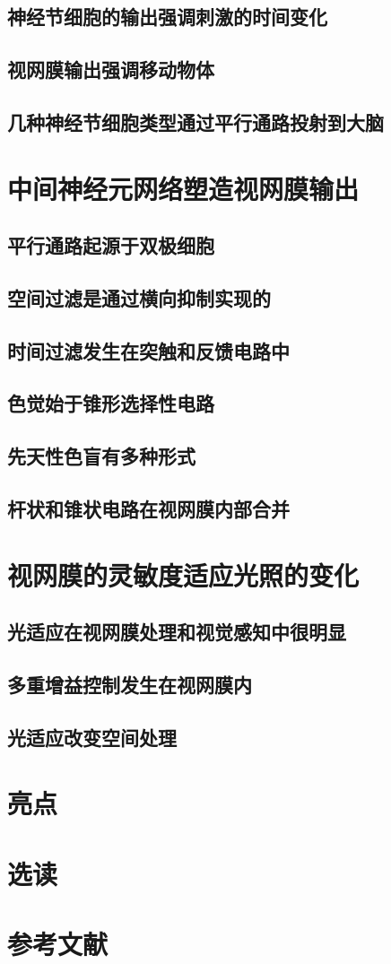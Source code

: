 \subsection{神经节细胞的输出强调刺激的时间变化}
\subsection{视网膜输出强调移动物体}
\subsection{几种神经节细胞类型通过平行通路投射到大脑}

\section{中间神经元网络塑造视网膜输出}
\subsection{平行通路起源于双极细胞}
\subsection{空间过滤是通过横向抑制实现的}
\subsection{时间过滤发生在突触和反馈电路中}
\subsection{色觉始于锥形选择性电路}
\subsection{先天性色盲有多种形式}
\subsection{杆状和锥状电路在视网膜内部合并}

\section{视网膜的灵敏度适应光照的变化}
\subsection{光适应在视网膜处理和视觉感知中很明显}
\subsection{多重增益控制发生在视网膜内}
\subsection{光适应改变空间处理}

\section{亮点}
\section{选读}
\section{参考文献}